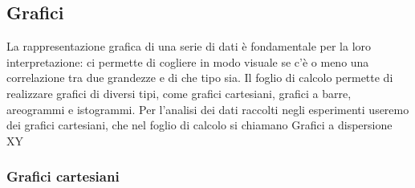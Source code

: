 \subsection{Grafici}
La rappresentazione grafica di una serie di dati è fondamentale per la loro interpretazione: ci permette di cogliere in modo visuale se c'è o meno una correlazione tra due grandezze e di che tipo sia.
Il foglio di calcolo permette di realizzare grafici di diversi tipi, come grafici cartesiani, grafici a barre, areogrammi e istogrammi.
Per l'analisi dei dati raccolti negli esperimenti useremo dei grafici cartesiani, che nel foglio di calcolo si chiamano Grafici a dispersione XY

\subsubsection{Grafici cartesiani}

